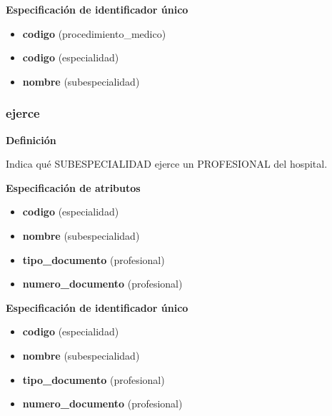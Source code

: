 \documentclass[a4paper,11pt]{article}
\begin{document}
\textbf{Especificación de identificador único}

\begin{itemize}

     \item \textbf{codigo} (procedimiento\_medico)

     \item \textbf{codigo} (especialidad)

     \item \textbf{nombre} (subespecialidad)

\end{itemize}

\subsubsection{\textbf{ejerce}}

\textbf{Definición}

Indica qué SUBESPECIALIDAD ejerce un PROFESIONAL del hospital.

\textbf{Especificación de atributos}


\begin{itemize}

     \item \textbf{codigo} (especialidad)

     \item \textbf{nombre} (subespecialidad)

     \item \textbf{tipo\_documento} (profesional)

     \item \textbf{numero\_documento} (profesional)

\end{itemize}

\textbf{Especificación de identificador único}

\begin{itemize}

     \item \textbf{codigo} (especialidad)

     \item \textbf{nombre} (subespecialidad)

     \item \textbf{tipo\_documento} (profesional)

     \item \textbf{numero\_documento} (profesional)

\end{itemize}
\end{document}
